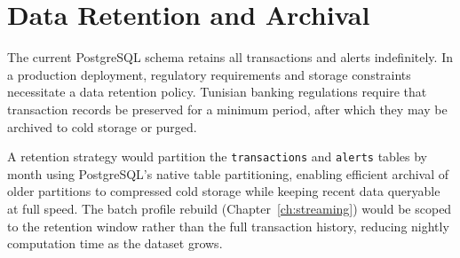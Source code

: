 \section{Data Retention and Archival}
\label{sec:data-retention}

The current PostgreSQL schema retains all transactions and alerts
indefinitely. In a production deployment, regulatory requirements and
storage constraints necessitate a data retention policy. Tunisian banking
regulations require that transaction records be preserved for a minimum
period, after which they may be archived to cold storage or purged.

A retention strategy would partition the \texttt{transactions} and
\texttt{alerts} tables by month using PostgreSQL's native table
partitioning, enabling efficient archival of older partitions to
compressed cold storage while keeping recent data queryable at full
speed. The batch profile rebuild
(Chapter~\ref{ch:streaming}) would be scoped to the retention window
rather than the full transaction history, reducing nightly computation
time as the dataset grows.